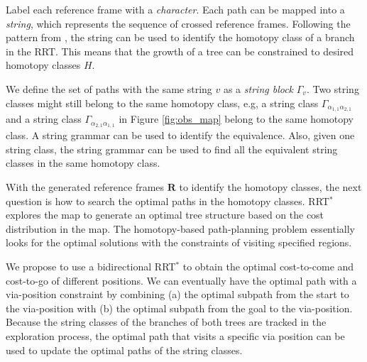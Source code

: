 \documentclass[phd]{byuprop}
\begin{document}
Label each reference frame with a \emph{character}.
Each path can be mapped into a {\em string}, which represents the sequence of crossed reference frames.
Following the pattern from \cite{Hernandez2015}, the string can be used to identify the homotopy class of a branch in the RRT.
This means that the growth of a tree can be constrained to desired homotopy classes $ H $.

We define the set of paths with the same string $ v $ as a \emph{string block} $ \Gamma_{v} $.
Two string classes might still belong to the same homotopy class, e.g, a string class $ \Gamma_{\alpha_{1,1}\alpha_{2,1}} $ and a string class $ \Gamma_{\alpha_{2,1}\alpha_{1,1}} $ in Figure \ref{fig:obs_map} belong to the same homotopy class.
A string grammar can be used to identify the equivalence.
Also, given one string class, the string grammar can be used to find all the equivalent string classes in the same homotopy class.

With the generated reference frames $ \mathbf{R} $ to identify the homotopy classes, the next question is how to search the optimal paths in the homotopy classes.
RRT$^{*}$ explores the map to generate an optimal tree structure based on the cost distribution in the map.
The homotopy-based path-planning problem essentially looks for the optimal solutions with the constraints of visiting specified regions.

We propose to use a bidirectional RRT$^{*}$ to obtain the optimal cost-to-come and cost-to-go of different positions.
We can eventually have the optimal path with a via-position constraint by combining (a) the optimal subpath from the start to the via-position with (b) the optimal subpath from the goal to the via-position.
Because the string classes of the branches of both trees are tracked in the exploration process, the optimal path that visits a specific via position can be used to update the optimal paths of the string classes. 




\end{document}
